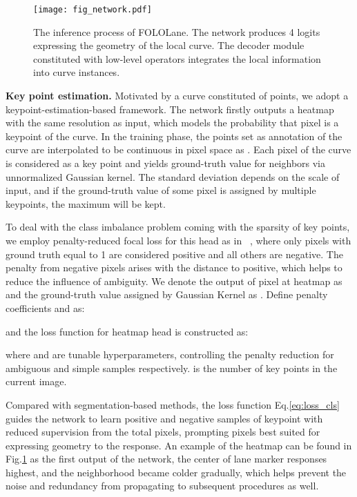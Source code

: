 \documentclass[final]{cvpr}
\begin{document}
\begin{figure}[t]
	\begin{center}
		\texttt{[image: fig\_network.pdf]}
	\end{center}
	\caption{The inference process of FOLOLane. The network produces 4 logits expressing the geometry of the local curve. The decoder module constituted with low-level operators integrates the local information into curve instances. }
	\label{fig:network}
\end{figure}


\textbf{Key point estimation.}  Motivated by a curve constituted of points, we adopt a keypoint-estimation-based framework. The network firstly outputs a heatmap with the same resolution as input, which models the probability that pixel is a keypoint of the curve. In the training phase, the points set as annotation of the  curve are interpolated to be continuous in pixel space as . Each pixel of the curve  is considered as a key point and yields ground-truth value for neighbors via unnormalized Gaussian kernel. The standard deviation  depends on the scale of input, and if the ground-truth value of some pixel is assigned by multiple keypoints, the maximum will be kept.

To deal with the class imbalance problem coming with the sparsity of key points, we employ penalty-reduced focal loss for this head as in ~\cite{law2018cornernet,zhou2019object}, where only pixels with ground truth equal to 1 are considered positive and all others are negative. The penalty from negative pixels arises with the distance to positive, which helps to reduce the influence of ambiguity. We denote the output of  pixel at heatmap as  and the ground-truth value assigned by Gaussian Kernel as . Define penalty coefficients  and  as:

and the loss function for heatmap head is constructed as:

\noindent where  and  are tunable hyperparameters, controlling the penalty reduction for ambiguous and simple samples respectively.  is the number of key points in the current image.

Compared with segmentation-based methods, the loss function Eq.\ref{eq:loss_cls} guides the network to learn positive and negative samples of keypoint with reduced supervision from the total pixels, prompting pixels best suited for expressing geometry to the response. An example of the heatmap can be found in Fig.\ref{fig:network} as the first output of the network, the center of lane marker responses highest, and the neighborhood became colder gradually, which helps prevent the noise and redundancy from propagating to subsequent procedures as well.
\end{document}
